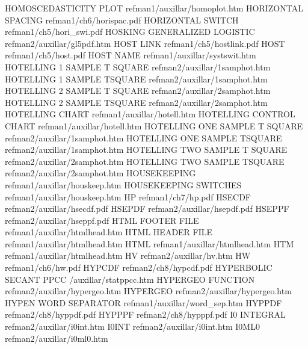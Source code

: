 HOMOSCEDASTICITY PLOT                   refman1/auxillar/homoplot.htm
HORIZONTAL SPACING                      refman1/ch6/horispac.pdf
HORIZONTAL SWITCH                       refman1/ch5/hori_swi.pdf
HOSKING GENERALIZED LOGISTIC            refman2/auxillar/gl5pdf.htm
HOST LINK                               refman1/ch5/hostlink.pdf
HOST                                    refman1/ch5/host.pdf
HOST NAME                               refman1/auxillar/systswit.htm
HOTELLING 1 SAMPLE T SQUARE             refman2/auxillar/1samphot.htm
HOTELLING 1 SAMPLE TSQUARE              refman2/auxillar/1samphot.htm
HOTELLING 2 SAMPLE T SQUARE             refman2/auxillar/2samphot.htm
HOTELLING 2 SAMPLE TSQUARE              refman2/auxillar/2samphot.htm
HOTELLING CHART                         refman1/auxillar/hotell.htm
HOTELLING CONTROL CHART                 refman1/auxillar/hotell.htm
HOTELLING ONE SAMPLE T SQUARE           refman2/auxillar/1samphot.htm
HOTELLING ONE SAMPLE TSQUARE            refman2/auxillar/1samphot.htm
HOTELLING TWO SAMPLE T SQUARE           refman2/auxillar/2samphot.htm
HOTELLING TWO SAMPLE TSQUARE            refman2/auxillar/2samphot.htm
HOUSEKEEPING                            refman1/auxillar/houskeep.htm
HOUSEKEEPING SWITCHES                   refman1/auxillar/houskeep.htm
HP                                      refman1/ch7/hp.pdf
HSECDF                                  refman2/auxillar/hsecdf.pdf
HSEPDF                                  refman2/auxillar/hsepdf.pdf
HSEPPF                                  refman2/auxillar/hseppf.pdf
HTML FOOTER FILE                        refman1/auxillar/htmlhead.htm
HTML HEADER FILE                        refman1/auxillar/htmlhead.htm
HTML                                    refman1/auxillar/htmlhead.htm
HTM                                     refman1/auxillar/htmlhead.htm
HV                                      refman2/auxillar/hv.htm
HW                                      refman1/ch6/hw.pdf
HYPCDF                                  refman2/ch8/hypcdf.pdf
HYPERBOLIC SECANT PPCC                  /auxillar/statppcc.htm
HYPERGEO FUNCTION                       refman2/auxillar/hypergeo.htm
HYPERGEO                                refman2/auxillar/hypergeo.htm
HYPEN WORD SEPARATOR                    refman1/auxillar/word_sep.htm
HYPPDF                                  refman2/ch8/hyppdf.pdf
HYPPPF                                  refman2/ch8/hypppf.pdf
I0 INTEGRAL                             refman2/auxillar/i0int.htm
I0INT                                   refman2/auxillar/i0int.htm
I0ML0                                   refman2/auxillar/i0ml0.htm

